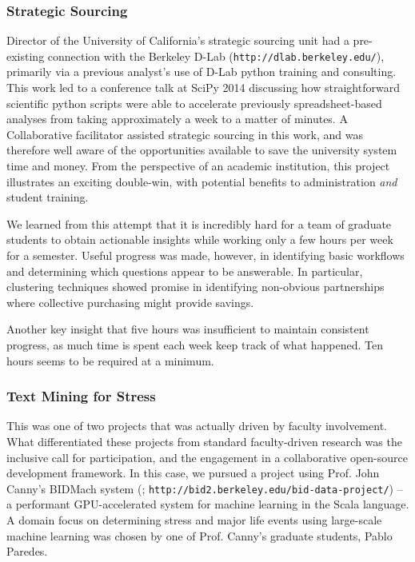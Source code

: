 \documentclass{sig-alternate}
\begin{document}
\subsubsection*{Strategic Sourcing}

Director of the University of California's strategic sourcing unit had a pre-existing connection with the Berkeley D-Lab (\texttt{http://dlab.berkeley.edu/}), primarily via a previous analyst's use of D-Lab python training and consulting. This work led to a conference talk at SciPy 2014 discussing how straightforward scientific python scripts were able to accelerate previously spreadsheet-based analyses from taking approximately a week to a matter of minutes. A Collaborative facilitator assisted strategic sourcing in this work, and was therefore well aware of the opportunities available to save the university system time and money. From the perspective of an academic institution, this project illustrates an exciting double-win, with potential benefits to administration \emph{and} student training. 

We learned from this attempt that it is incredibly hard for a team of graduate students to obtain actionable insights while working only a few hours per week for a semester. Useful progress was made, however, in identifying basic workflows and determining which questions appear to be answerable. In particular, clustering techniques showed promise in identifying non-obvious partnerships where collective purchasing might provide savings.

Another key insight that five hours was insufficient to maintain consistent progress, as much time is spent each week keep track of what happened. Ten hours seems to be required at a minimum. 

\subsubsection*{Text Mining for Stress}

This was one of two projects that was actually driven by faculty involvement. What differentiated these projects from standard faculty-driven research was the inclusive call for participation, and the engagement in a collaborative open-source development framework. In this case, we pursued a project using Prof. John Canny's BIDMach system (\cite{canny2013bidmach}; \texttt{http://bid2.berkeley.edu/bid-data-project/}) -- a performant GPU-accelerated system for machine learning in the Scala language. A domain focus on determining stress and major life events using large-scale machine learning was chosen by one of Prof. Canny's graduate students, Pablo Paredes.
\end{document}
